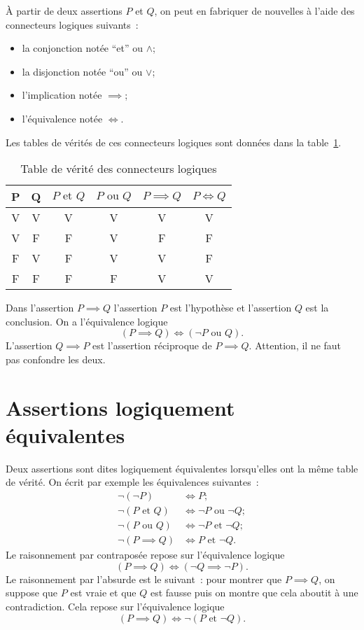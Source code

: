 À partir de deux assertions $P$ et $Q$, on peut en fabriquer de nouvelles à l'aide des connecteurs logiques suivants~:
\begin{itemize}
\item la conjonction notée ``et'' ou $\wedge$;
\item la disjonction notée ``ou'' ou $\vee$;
\item l'implication notée $\implies$;
\item l'équivalence notée $\iff$.
\end{itemize}
Les tables de vérités de ces connecteurs logiques sont données dans la table~\ref{tab:tabverconn}.
\begin{table}[!h]
  \centering
  \begin{tabular}{|c|c|c|c|c|c|}\hline
    P & Q & $P \text{~et~} Q$ & $P \text{~ou~} Q$ & $P \implies Q$ & $P \iff Q$ \\ \hline
    V & V & V & V & V & V \\
    V & F & F & V & F & F \\
    F & V & F & V & V & F \\
    F & F & F & F & V & V \\ \hline
  \end{tabular}
  \caption{Table de vérité des connecteurs logiques}
  \label{tab:tabverconn}
\end{table}

Dans l'assertion $P \implies Q$ l'assertion $P$ est l'hypothèse et l'assertion $Q$ est la conclusion. On a l'équivalence logique
\begin{equation}
  (P \implies Q) \iff (\neg P \text{~ou~} Q).
\end{equation}
L'assertion $Q \implies P$ est l'assertion réciproque de $P \implies Q$. Attention, il ne faut pas confondre les deux.
%
\section{Assertions logiquement équivalentes}
\label{chap0sec:assertionslogiquementequiv}
Deux assertions sont dites logiquement équivalentes lorsqu'elles ont la même table de vérité. On écrit par exemple les équivalences suivantes~:
\begin{align}
  \neg(\neg P) &\iff P; \\
  \neg(P \text {~et~} Q) & \iff \neg P \text{~ou~} \neg Q; \\
  \neg(P \text{~ou~} Q) & \iff \neg P \text {~et~} \neg Q; \\
  \neg(P \implies Q) & \iff P \text {~et~} \neg Q.
\end{align}
Le raisonnement par contraposée repose sur l'équivalence logique
\begin{equation}
  (P \implies Q) \iff (\neg Q \implies \neg P).
\end{equation}
Le raisonnement par l'absurde est le suivant~: pour montrer que $P \implies Q$, on suppose que $P$ est vraie et que $Q$ est fausse puis on montre que cela aboutit à une contradiction. Cela repose sur l'équivalence logique
\begin{equation}
  (P \implies Q) \iff \neg(P \text {~et~} \neg Q).
\end{equation}
%
